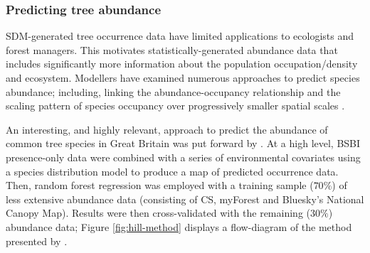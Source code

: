 \subsubsection{Predicting tree abundance}

SDM-generated tree occurrence data have limited applications to ecologists and forest managers.
This motivates statistically-generated abundance data that includes significantly 
more information about the population occupation/density and ecosystem.
Modellers have examined numerous approaches to predict species abundance;
including, linking the abundance-occupancy relationship \cite{gaston2000abundance} and
the scaling pattern of species occupancy over progressively smaller spatial scales \cite{hui2009extrapolating}.

An interesting, and highly relevant, approach to predict the abundance of common tree species in Great Britain was put forward by \cite{hill.data}.
At a high level, BSBI presence-only data were combined with a series of environmental covariates using a species distribution model to 
produce a map of predicted occurrence data. Then, random forest regression was employed with a training sample ($70\%$) of less extensive abundance 
data (consisting of CS, myForest and Bluesky's National Canopy Map). 
Results were then cross-validated with the remaining ($30\%$) abundance data; Figure \ref{fig:hill-method} displays a
flow-diagram of the method presented by \cite{hill.data}. 

